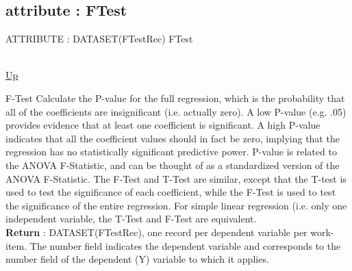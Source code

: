 \subsection*{attribute : FTest}
\hypertarget{ecldoc:linearregression.ols.ftest}{ATTRIBUTE : DATASET(FTestRec) FTest} \\
\hyperlink{ecldoc:linearregression.ols}{Up} \\
\par
F-Test Calculate the P-value for the full regression, which is the probability that all of the coefficients are insignificant (i.e. actually zero). A low P-value (e.g. .05) provides evidence that at least one coefficient is significant. A high P-value indicates that all the coefficient values should in fact be zero, implying that the regression has no statistically significant predictive power. P-value is related to the ANOVA F-Statistic, and can be thought of as a standardized version of the ANOVA F-Statistic. The F-Test and T-Test are similar, except that the T-test is used to test the significance of each coefficient, while the F-Test is used to test the significance of the entire regression. For simple linear regression (i.e. only one independent variable, the T-Test and F-Test are equivalent. \\
\textbf{Return} : DATASET(FTestRec), one record per dependent variable per work-item. The number field indicates the dependent variable and corresponds to the number field of the dependent (Y) variable to which it applies. \\

